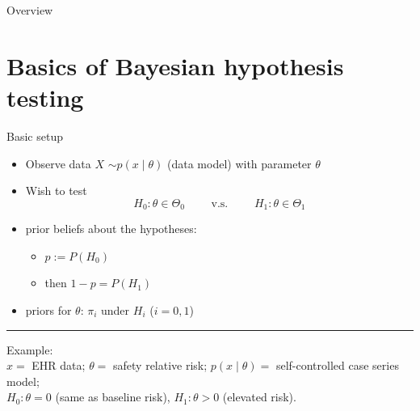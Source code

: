 \documentclass[11pt
,fragile=singleslide
,xcolor=dvipsnames
]{beamer}
\begin{document}
	
	\begin{frame}{Overview}
		\tableofcontents
	\end{frame}
	
	\section{Basics of Bayesian hypothesis testing}
	
	
	\begin{frame}{Basic setup}
		\begin{itemize}
			\item Observe data $X$  $ \sim p(x \mid \theta)$ (data model) with parameter $\theta$
			\item Wish to test 
			\begin{equation*}
			H_0: \theta \in \Theta_0 \qquad \text{ v.s. } \qquad H_1: \theta \in \Theta_1
			\end{equation*}
			\vspace{-0.2in}
			\pause
			\item prior beliefs about the hypotheses: 
			\begin{itemize}
				\item $p := P(H_0)$
				\item then $1-p = P(H_1)$
			\end{itemize}
			\item priors for $\theta$: $\pi_i$ under $H_i$ ($i=0,1$)
		\end{itemize}
	
	\vfill
	\rule{0.6\textwidth}{0.4pt}
	
	\footnotesize{
	Example:\\
	$x =$ EHR data; $\theta =$ safety relative risk; $p(x \mid \theta) = $ self-controlled case series model;\\
	$H_0: \theta = 0$ (same as baseline risk), $H_1: \theta > 0$ (elevated risk).
}
		
	\end{frame}
	
\end{document}
